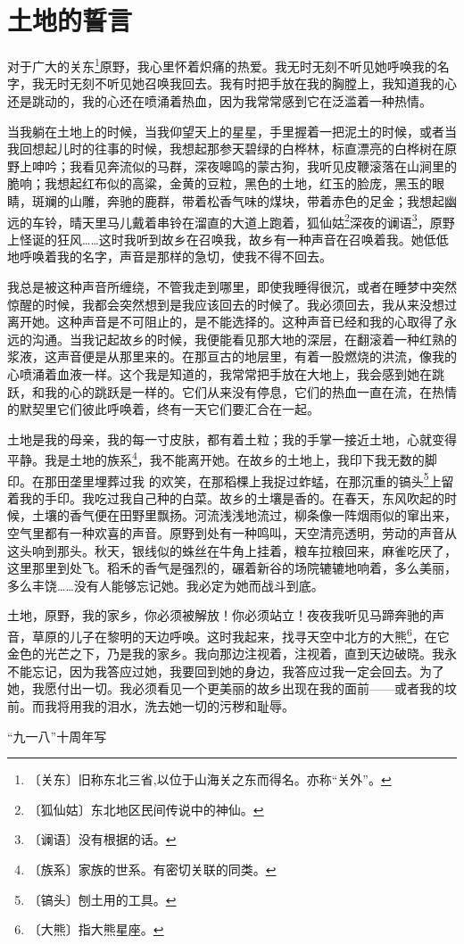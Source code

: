 \documentclass[12pt,UTF-8,openany]{ctexbook}
\begin{document}
\chapter{土地的誓言}

\begin{large}
    
    对于广大的关东\footnote{〔关东〕旧称东北三省,以位于山海关之东而得名。亦称“关外”。}原野，我心里怀着炽痛的热爱。我无时无刻不听见她呼唤我的名字，我无时无刻不听见她召唤我回去。我有时把手放在我的胸膛上，我知道我的心还是跳动的，我的心还在喷涌着热血，因为我常常感到它在泛滥着一种热情。
    
    当我躺在土地上的时候，当我仰望天上的星星，手里握着一把泥土的时候，或者当我回想起儿时的往事的时候，我想起那参天碧绿的白桦林，标直漂亮的白桦树在原野上呻吟；我看见奔流似的马群，深夜嗥鸣的蒙古狗，我听见皮鞭滚落在山涧里的脆响；我想起红布似的高粱，金黄的豆粒，黑色的土地，红玉的脸庞，黑玉的眼睛，斑斓的山雕，奔驰的鹿群，带着松香气味的煤块，带着赤色的足金；我想起幽远的车铃，晴天里马儿戴着串铃在溜直的大道上跑着，狐仙姑\footnote{〔狐仙姑〕东北地区民间传说中的神仙。}深夜的谰语\footnote{〔谰语〕没有根据的话。}，原野上怪诞的狂风……这时我听到故乡在召唤我，故乡有一种声音在召唤着我。她低低地呼唤着我的名字，声音是那样的急切，使我不得不回去。
    
    我总是被这种声音所缠绕，不管我走到哪里，即使我睡得很沉，或者在睡梦中突然惊醒的时候，我都会突然想到是我应该回去的时候了。我必须回去，我从来没想过离开她。这种声音是不可阻止的，是不能选择的。这种声音已经和我的心取得了永远的沟通。当我记起故乡的时候，我便能看见那大地的深层，在翻滚着一种红熟的浆液，这声音便是从那里来的。在那亘古的地层里，有着一股燃烧的洪流，像我的心喷涌着血液一样。这个我是知道的，我常常把手放在大地上，我会感到她在跳跃，和我的心的跳跃是一样的。它们从来没有停息，它们的热血一直在流，在热情的默契里它们彼此呼唤着，终有一天它们要汇合在一起。
    
    土地是我的母亲，我的每一寸皮肤，都有着土粒；我的手掌一接近土地，心就变得平静。我是土地的族系\footnote{〔族系〕家族的世系。有密切关联的同类。}，我不能离开她。在故乡的土地上，我印下我无数的脚印。在那田垄里埋葬过我 的欢笑，在那稻棵上我捉过蚱蜢，在那沉重的镐头\footnote{〔镐头〕刨土用的工具。}上留着我的手印。我吃过我自己种的白菜。故乡的土壤是香的。在春天，东风吹起的时候，土壤的香气便在田野里飘扬。河流浅浅地流过，柳条像一阵烟雨似的窜出来，空气里都有一种欢喜的声音。原野到处有一种鸣叫，天空清亮透明，劳动的声音从这头响到那头。秋天，银线似的蛛丝在牛角上挂着，粮车拉粮回来，麻雀吃厌了，这里那里到处飞。稻禾的香气是强烈的，碾着新谷的场院辘辘地响着，多么美丽，多么丰饶……没有人能够忘记她。我必定为她而战斗到底。
    
    土地，原野，我的家乡，你必须被解放！你必须站立！夜夜我听见马蹄奔驰的声音，草原的儿子在黎明的天边呼唤。这时我起来，找寻天空中北方的大熊\footnote{〔大熊〕指大熊星座。}，在它金色的光芒之下，乃是我的家乡。我向那边注视着，注视着，直到天边破晓。我永不能忘记，因为我答应过她，我要回到她的身边，我答应过我一定会回去。为了她，我愿付出一切。我必须看见一个更美丽的故乡出现在我的面前——或者我的坟前。而我将用我的泪水，洗去她一切的污秽和耻辱。
    
    \hfill “九一八”十周年写
    
\end{large}
\end{document}
